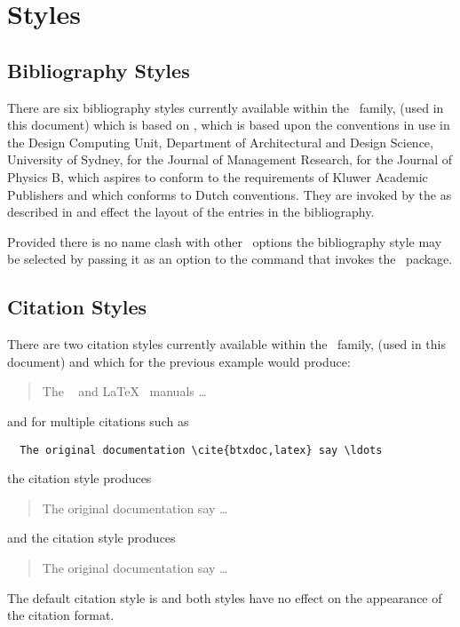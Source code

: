 \section{Styles}
\subsection{Bibliography Styles}
There are six bibliography styles currently available within the
\harvard\ family,  (used in this document) which is based on 
, 
which is based upon the conventions in use in the Design Computing Unit,
Department of Architectural and Design Science, University of Sydney,
 for the Journal of Management Research,
 for the Journal of Physics B,
 which aspires to conform to the requirements of Kluwer Academic
Publishers and  which conforms to Dutch conventions.
They are invoked by the  as described in
 and effect the layout of the entries in the bibliography.

Provided there is no name clash with other \harvard\ options the
bibliography style may be selected by passing it as an option to the
 command that invokes the \harvard\ package.

\subsection{Citation Styles}
There are two citation styles currently available within the \harvard\ 
family,  (used in this document) and  which for the previous
example would produce:
\begin{quote}
The \BibTeX\ \cite{btxdoc} and \LaTeX\ \cite[Annex~B]{latex} manuals \ldots
\end{quote}
and for multiple citations such as
\begin{verbatim}
  The original documentation \cite{btxdoc,latex} say \ldots
\end{verbatim}
the  citation style produces
\begin{quote}
The original documentation \cite{btxdoc,latex} say \ldots
\end{quote}
and the  citation style produces
\begin{quote}
The original documentation \cite{btxdoc,latex} say \ldots
\end{quote}
The default citation style is  and both styles have no effect on the
appearance of the \comname{citeasnoun} citation format.


